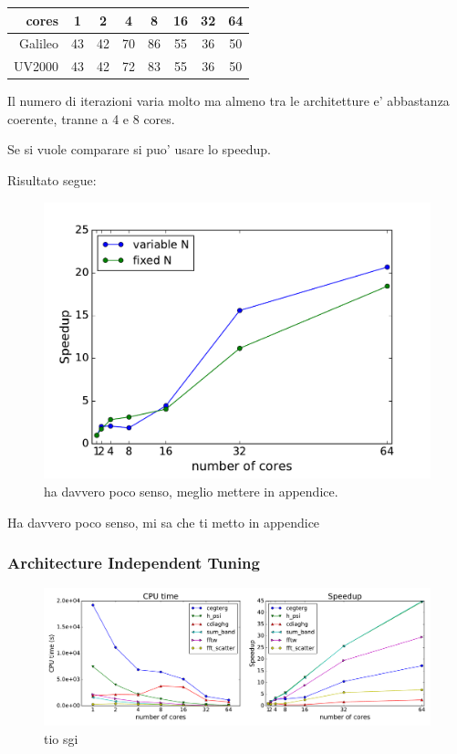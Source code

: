 \documentclass[a4paper,12pt]{article}
\begin{document}
\begin{center}
\begin{tabular}{r|ccccccc}
\toprule
cores 	 &  1  &  2  &  4  &  8  &  16  &  32  &  64 \\
\midrule
Galileo	 & 43  & 42  & 70  & 86  &  55  &  36  &  50 \\ 
UV2000	 & 43  & 42  & 72  & 83  &  55  &  36  &  50 \\ 
\bottomrule
\end{tabular}
\end{center}


Il numero di iterazioni varia molto ma almeno tra le architetture e' abbastanza coerente, tranne a 4 e 8 cores.

Se si vuole comparare si puo' usare lo speedup. 

Risultato segue:

\begin{figure}[hhh!]
	\centerline{\includegraphics[width=0.6\linewidth]{fixed_vs_variable_speedup.pdf}}
	\caption{ ha davvero poco senso, meglio mettere in appendice.
	}
	\label{fig:fixedvsvariablespeedup}
\end{figure}

Ha davvero poco senso, mi sa che ti metto in appendice

\newpage
\subsubsection{Architecture Independent Tuning}





\begin{figure}[hhh!]
\centerline{ \includegraphics[width=1.3\linewidth]{relevant_subroutines.pdf}	}
	\caption{tio sgi}
	\label{fig:relevantSubroutines}

\end{figure}
\end{document}
